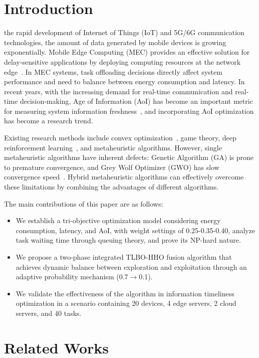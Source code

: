 \documentclass[conference]{IEEEtran}
\begin{document}
\section{Introduction}
 the rapid development of Internet of Things (IoT) and 5G/6G communication technologies, the amount of data generated by mobile devices is growing exponentially. Mobile Edge Computing (MEC) provides an effective solution for delay-sensitive applications by deploying computing resources at the network edge~\cite{b1}. In MEC systems, task offloading decisions directly affect system performance and need to balance between energy consumption and latency. In recent years, with the increasing demand for real-time communication and real-time decision-making, Age of Information (AoI) has become an important metric for measuring system information freshness~\cite{b15}, and incorporating AoI optimization has become a research trend.

Existing research methods include convex optimization~\cite{b2}, game theory, deep reinforcement learning~\cite{b3}, and metaheuristic algorithms. However, single metaheuristic algorithms have inherent defects: Genetic Algorithm (GA) is prone to premature convergence, and Grey Wolf Optimizer (GWO) has slow convergence speed~\cite{b4}. Hybrid metaheuristic algorithms can effectively overcome these limitations by combining the advantages of different algorithms.

The main contributions of this paper are as follows:
\begin{itemize}
    \item We establish a tri-objective optimization model considering energy consumption, latency, and AoI, with weight settings of 0.25-0.35-0.40, analyze task waiting time through queuing theory, and prove its NP-hard nature.
    \item We propose a two-phase integrated TLBO-HHO fusion algorithm that achieves dynamic balance between exploration and exploitation through an adaptive probability mechanism (0.7$\rightarrow$0.1).
    \item We validate the effectiveness of the algorithm in information timeliness optimization in a scenario containing 20 devices, 4 edge servers, 2 cloud servers, and 40 tasks.
\end{itemize}

\section{Related Works}
\end{document}
